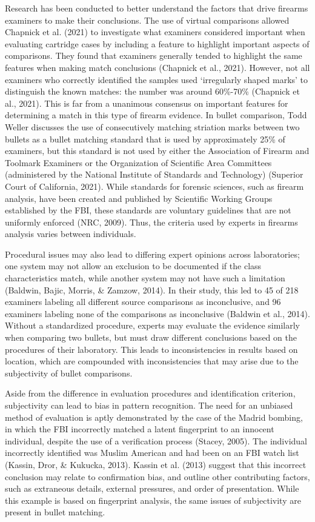 \documentclass[print]{nuthesis}
\begin{document}
Research has been conducted to better understand the factors that drive firearms examiners to make their conclusions.
The use of virtual comparisons allowed Chapnick et al. (2021) to investigate what examiners considered important when evaluating cartridge cases by including a feature to highlight important aspects of comparisons.
They found that examiners generally tended to highlight the same features when making match conclusions (Chapnick et al., 2021).
However, not all examiners who correctly identified the samples used `irregularly shaped marks' to distinguish the known matches: the number was around 60\%-70\% (Chapnick et al., 2021).
This is far from a unanimous consensus on important features for determining a match in this type of firearm evidence.
In bullet comparison, Todd Weller discusses the use of consecutively matching striation marks between two bullets as a bullet matching standard that is used by approximately 25\% of examiners, but this standard is not used by either the Association of Firearm and Toolmark Examiners or the Organization of Scientific Area Committees (administered by the National Institute of Standards and Technology) (Superior Court of California, 2021).
While standards for forensic sciences, such as firearm analysis, have been created and published by Scientific Working Groups established by the FBI, these standards are voluntary guidelines that are not uniformly enforced (NRC, 2009).
Thus, the criteria used by experts in firearms analysis varies between individuals.

Procedural issues may also lead to differing expert opinions across laboratories; one system may not allow an exclusion to be documented if the class characteristics match, while another system may not have such a limitation (Baldwin, Bajic, Morris, \& Zamzow, 2014).
In their study, this led to 45 of 218 examiners labeling all different source comparisons as inconclusive, and 96 examiners labeling none of the comparisons as inconclusive (Baldwin et al., 2014).
Without a standardized procedure, experts may evaluate the evidence similarly when comparing two bullets, but must draw different conclusions based on the procedures of their laboratory.
This leads to inconsistencies in results based on location, which are compounded with inconsistencies that may arise due to the subjectivity of bullet comparisons.

Aside from the difference in evaluation procedures and identification criterion, subjectivity can lead to bias in pattern recognition.
The need for an unbiased method of evaluation is aptly demonstrated by the case of the Madrid bombing, in which the FBI incorrectly matched a latent fingerprint to an innocent individual, despite the use of a verification process (Stacey, 2005).
The individual incorrectly identified was Muslim American and had been on an FBI watch list (Kassin, Dror, \& Kukucka, 2013).
Kassin et al. (2013) suggest that this incorrect conclusion may relate to confirmation bias, and outline other contributing factors, such as extraneous details, external pressures, and order of presentation.
While this example is based on fingerprint analysis, the same issues of subjectivity are present in bullet matching.
\end{document}
